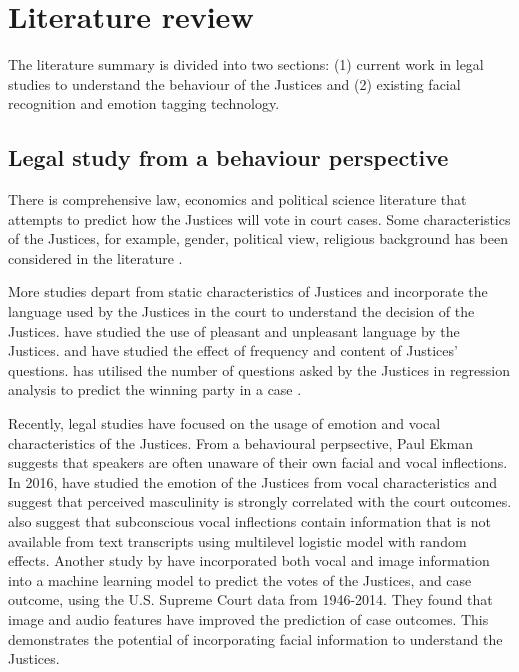 \documentclass{monashthesis}
\begin{document}
\hypertarget{literature-review}{%
\section{Literature review}\label{literature-review}}

The literature summary is divided into two sections: (1) current work in legal studies to understand the behaviour of the Justices and (2) existing facial recognition and emotion tagging technology.

\hypertarget{legal-study-from-a-behaviour-perspective}{%
\subsection{Legal study from a behaviour perspective}\label{legal-study-from-a-behaviour-perspective}}

There is comprehensive law, economics and political science literature that attempts to predict how the Justices will vote in court cases. Some characteristics of the Justices, for example, gender, political view, religious background has been considered in the literature \autocites{Stuart1962}{Peter1984}{Combining1987}{Steffensmeier2001}{Kulik2003}.

More studies depart from static characteristics of Justices and incorporate the language used by the Justices in the court to understand the decision of the Justices. \textcite{black2011emotions} have studied the use of pleasant and unpleasant language by the Justices. \textcite{Shullman2004illusion} and \textcite{johnson2009inquiring} have studied the effect of frequency and content of Justices' questions. \textcite{epstein2010inferring} has utilised the number of questions asked by the Justices in regression analysis to predict the winning party in a case .

Recently, legal studies have focused on the usage of emotion and vocal characteristics of the Justices. From a behavioural perpsective, Paul Ekman \autocite{ekman1991invited} suggests that speakers are often unaware of their own facial and vocal inflections. In 2016, \textcite{chen2016perceived} have studied the emotion of the Justices from vocal characteristics and suggest that perceived masculinity is strongly correlated with the court outcomes. \textcite{dietrich2019emotional} also suggest that subconscious vocal inflections contain information that is not available from text transcripts using multilevel logistic model with random effects. Another study by \textcite{chen2018justice} have incorporated both vocal and image information into a machine learning model to predict the votes of the Justices, and case outcome, using the U.S. Supreme Court data from 1946-2014. They found that image and audio features have improved the prediction of case outcomes. This demonstrates the potential of incorporating facial information to understand the Justices.
\end{document}
